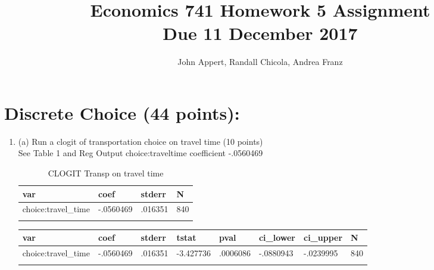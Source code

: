 \documentclass{article}
\begin{document}
\title{Economics 741
Homework 5 Assignment \\
\large Due 11 December 2017}
\author{John Appert, Randall Chicola, Andrea Franz}
\maketitle
\section{Discrete Choice (44 points):} 
\begin{enumerate}[label=\alph*]



\item  (a) Run a clogit of transportation choice on travel time (10 points)\\

See Table 1 and Reg Output choice:traveltime coefficient -.0560469



\begin{table}[tbp] \centering
{}

\caption{CLOGIT Transp on travel time}
\begin{tabularx}{\textwidth}{lCCC}

\toprule
{var}&{coef}&{stderr}&{N} \tabularnewline
\midrule\addlinespace[1.5ex]
choice:travel\_time&-.0560469&.016351&840 \tabularnewline
\bottomrule \addlinespace[1.5ex]

\end{tabularx}
\end{table}


\begin{table}[tbp] \centering
{}

\begin{tabularx}{\textwidth}{lCCCCCCC}

\toprule
{var}&{coef}&{stderr}&{tstat}&{pval}&{ci\_lower}&{ci\_upper}&{N} \tabularnewline
\midrule\addlinespace[1.5ex]
choice:travel\_time&-.0560469&.016351&-3.427736&.0006086&-.0880943&-.0239995&840 \tabularnewline
\bottomrule \addlinespace[1.5ex]

\end{tabularx}
\end{table}




\end{enumerate}
\end{document}
